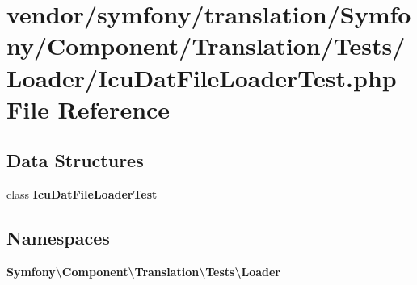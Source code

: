 \section{vendor/symfony/translation/\+Symfony/\+Component/\+Translation/\+Tests/\+Loader/\+Icu\+Dat\+File\+Loader\+Test.php File Reference}
\label{_icu_dat_file_loader_test_8php}
\subsection*{Data Structures}
\begin{DoxyCompactItemize}
\item 
class {\bf Icu\+Dat\+File\+Loader\+Test}
\end{DoxyCompactItemize}
\subsection*{Namespaces}
\begin{DoxyCompactItemize}
\item 
 {\bf Symfony\textbackslash{}\+Component\textbackslash{}\+Translation\textbackslash{}\+Tests\textbackslash{}\+Loader}
\end{DoxyCompactItemize}
